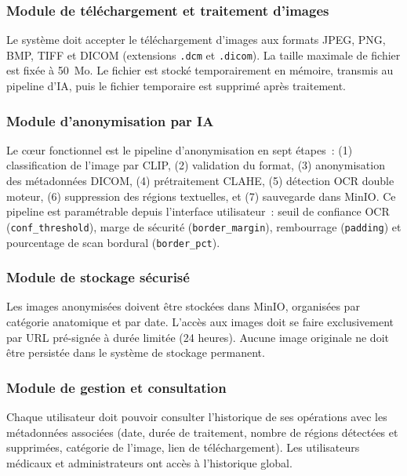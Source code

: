 \subsubsection{Module de téléchargement et traitement d'images}

Le système doit accepter le téléchargement d'images aux formats JPEG, PNG, BMP, TIFF et DICOM (extensions \texttt{.dcm} et \texttt{.dicom}). La taille maximale de fichier est fixée à 50~Mo. Le fichier est stocké temporairement en mémoire, transmis au pipeline d'IA, puis le fichier temporaire est supprimé après traitement.

\subsubsection{Module d'anonymisation par IA}

Le cœur fonctionnel est le pipeline d'anonymisation en sept étapes~: (1) classification de l'image par CLIP, (2) validation du format, (3) anonymisation des métadonnées DICOM, (4) prétraitement CLAHE, (5) détection OCR double moteur, (6) suppression des régions textuelles, et (7) sauvegarde dans MinIO. Ce pipeline est paramétrable depuis l'interface utilisateur~: seuil de confiance OCR (\texttt{conf\_threshold}), marge de sécurité (\texttt{border\_margin}), rembourrage (\texttt{padding}) et pourcentage de scan bordural (\texttt{border\_pct}).

\subsubsection{Module de stockage sécurisé}

Les images anonymisées doivent être stockées dans MinIO, organisées par catégorie anatomique et par date. L'accès aux images doit se faire exclusivement par URL pré-signée à durée limitée (24 heures). Aucune image originale ne doit être persistée dans le système de stockage permanent.

\subsubsection{Module de gestion et consultation}

Chaque utilisateur doit pouvoir consulter l'historique de ses opérations avec les métadonnées associées (date, durée de traitement, nombre de régions détectées et supprimées, catégorie de l'image, lien de téléchargement). Les utilisateurs médicaux et administrateurs ont accès à l'historique global.

